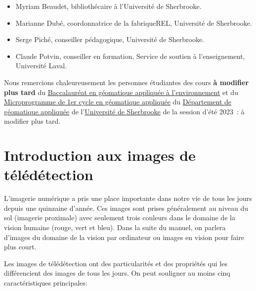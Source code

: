 \documentclass[
  11pt,
  letterpaper,
  open=any,
  twoside=false,
  french]{scrbook}
\begin{document}
\begin{itemize}
\item
  Myriam Beaudet, bibliothécaire à l'Université de Sherbrooke.
\item
  Marianne Dubé, coordonnatrice de la fabriqueREL, Université de
  Sherbrooke.
\item
  Serge Piché, conseiller pédagogique, Université de Sherbrooke.
\item
  Claude Potvin, conseiller en formation, Service de soutien à
  l'enseignement, Université Laval.
\end{itemize}

Nous remercions chaleureusement les personnes étudiantes des cours
\textbf{à modifier plus tard} du
\href{https://www.usherbrooke.ca/admission/programme/271/baccalaureat-en-geomatiqueappliquee-a-lenvironnement/}{Baccalauréat
en géomatique appliquée à l'environnement} et du
\href{https://www.usherbrooke.ca/admission/programme/429/microprogramme-de-1er-cycleen-geomatique-appliquee/}{Microprogramme
de 1er cycle en géomatique appliquée} du
\href{https://www.usherbrooke.ca/geomatique/}{Département de géomatique
appliquée} de l'\href{https://www.usherbrooke.ca/}{Université de
Sherbrooke} de la session d'été 2023~: à modifier plus tard.

\section*{Introduction aux images de télédétection}\label{sect006}


L'imagerie numérique a pris une place importante dans notre vie de tous
les jours depuis une quinzaine d'année. Ces images sont prises
généralement au niveau du sol (imagerie proximale) avec seulement trois
couleurs dans le domaine de la vision humaine (rouge, vert et bleu).
Dans la suite du manuel, on parlera d'images du domaine de la vision par
ordinateur ou images en vision pour faire plus court.

Les images de télédétection ont des particularités et des propriétés qui
les différencient des images de tous les jours. On peut souligner au
moins cinq caractéristiques principales:
\end{document}
